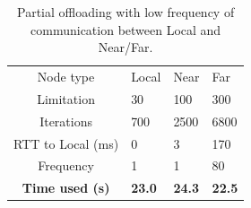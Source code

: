 \begin{table}[h!]
    \centering
    \begin{tabular}[c]{c|p{2cm}p{2cm}p{2cm}}

        Node type & Local & Near & Far \\

        Limitation          & 30 & 100 & 300  \\

        Iterations          & 700 & 2500 & 6800 \\

        RTT to Local (ms)   & 0 & 3 & 170 \\

        Frequency           & 1 & 1 & 80 \\

        \hline
        \textbf{Time used (s)}       & \textbf{23.0} & \textbf{24.3} & \textbf{22.5} \\

    \end{tabular}
    \caption{Partial offloading with low frequency of communication between Local and Near/Far.}
    \label{tab:Cloudlet_partial_offloading_low_frequency}
\end{table}




